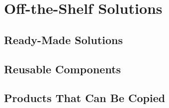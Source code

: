 \section{Off-the-Shelf Solutions}
\subsection{Ready-Made Solutions}
\subsection{Reusable Components}
\subsection{Products That Can Be Copied}